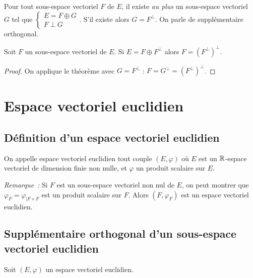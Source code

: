   \begin{corth}
    \label{corth:supportho}
    Pour tout sous-espace vectoriel \(F\) de \(E\), il existe \emph{au plus} un sous-espace vectoriel \(G\) tel que \(\begin{cases} E = F \oplus G \\ F \perp G \end{cases}\). S'il existe alors \(G=F^\perp\). On parle de supplémentaire orthogonal.
  \end{corth}
  \begin{corth}
    Soit \(F\) un sous-espace vectoriel de \(E\). Si \(E=F \oplus F^\perp\) alors \(F=(F^\perp)^\perp\).
  \end{corth}
  \begin{proof}
    On applique le théorème avec \(G=F^\perp\) : \(F=G^\perp = (F^\perp)^\perp\).
  \end{proof}

  \section{Espace vectoriel euclidien}

  \subsection{Définition d'un espace vectoriel euclidien}

  \begin{defdef}
    On appelle espace vectoriel euclidien tout couple \((E,\varphi)\) où \(E\) est un \(\mathbb{R}\)-espace vectoriel de dimension finie non nulle, et \(\varphi\) un produit scalaire sur \(E\).
  \end{defdef}

  \emph{Remarque~:} Si \(F\) est un sous-espace vectoriel non nul de \(E\), on peut montrer que \(\varphi_F=\varphi_{|F\times F}\) est un produit scalaire sur \(F\). Alors \((F,\varphi_F)\) est un espace vectoriel euclidien.

  \subsection{Supplémentaire orthogonal d'un sous-espace vectoriel euclidien}

  Soit \((E,\varphi)\) un espace vectoriel euclidien.

